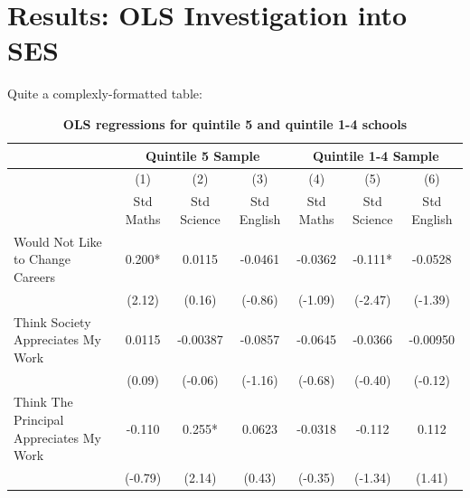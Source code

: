 \documentclass[12pt,preprint, authoryear]{article}
\numberwithin{equation}{section}
\numberwithin{figure}{section}
\numberwithin{table}{section}
\begin{document}
\normalsize

\section{\texorpdfstring{Results: OLS Investigation into SES
\label{OLS}}{Results: OLS Investigation into SES }}\label{results-ols-investigation-into-ses}

Quite a complexly-formatted table:

\scriptsize

\setcounter{table}{2}

\begin{longtable}[htbp] {p{6cm}*{3}{c} | c c c} \caption{
\textbf{OLS regressions for quintile 5 and quintile 1-4 schools}} \label{tab:OLS} \\ \hline\hline
                &\multicolumn{3}{c}{Quintile 5 Sample}&\multicolumn{3}{c}{Quintile 1-4 Sample}\\ \hline
                &\multicolumn{1}{c}{(1)}&\multicolumn{1}{c}{(2)}&\multicolumn{1}{c}{(3)}&\multicolumn{1}{c}{(4)}&\multicolumn{1}{c}{(5)}&\multicolumn{1}{c}{(6)}\\ 
                &\multicolumn{1}{c}{Std Maths}&\multicolumn{1}{c}{Std Science}&\multicolumn{1}{c}{Std English}&\multicolumn{1}{c}{Std Maths}&\multicolumn{1}{c}{Std Science}&\multicolumn{1}{c}{Std English}\\
\hline
Would Not Like to Change Careers&   0.200*         &   0.0115          &     -0.0461       &    -0.0362          &     -0.111*  &  -0.0528   \\
                &   (2.12)           &     (0.16)        &      (-0.86)        &     (-1.09)       &      (-2.47)    &   (-1.39) \\

Think Society Appreciates My Work&    0.0115           &  -0.00387    &       -0.0857          &      -0.0645      &      -0.0366   &   -0.00950  \\
                &    (0.09)         &       (-0.06)       &       (-1.16)      &     (-0.68)        &     (-0.40)    &  (-0.12) \\

Think The Principal Appreciates My Work&   -0.110           &    0.255*       &     0.0623        &    -0.0318       &    -0.112    &   0.112   \\
                &   (-0.79)          &    (2.14)         &      (0.43)       &    (-0.35)         &     (-1.34)    &  (1.41) \\


\end{longtable}
\end{document}
